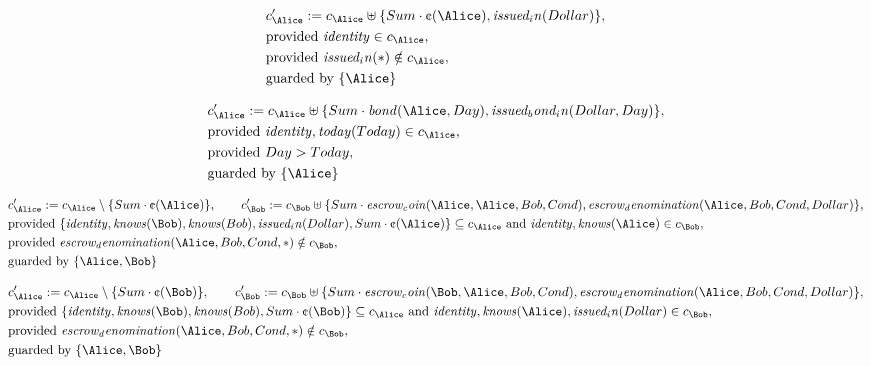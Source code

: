 \begin{align*}
&
c'_
{
\Alice
}
 := 
c_
{
\Alice
}
 \uplus 
\{
Sum
\cdot
\text{\textcent}
(
\Alice
)
,
\mathit{
issued_in
}
(
Dollar
)
\}
,\\
&
\text{provided } 
\mathit{
identity
}
 \in c_
{
\Alice
}
,\\
&
\text{provided } 
\mathit{
issued_in
}
(
\ast
)
 \notin c_
{
\Alice
}
,\\
&
\text{guarded by } \{
\Alice
\}
\end{align*}

\begin{align*}
&
c'_
{
\Alice
}
 := 
c_
{
\Alice
}
 \uplus 
\{
Sum
\cdot
\mathit{
bond
}
(
\Alice
,
Day
)
,
\mathit{
issued_bond_in
}
(
Dollar
,
Day
)
\}
,\\
&
\text{provided } 
\mathit{
identity
}
,
\mathit{
today
}
(
Today
)
 \in c_
{
\Alice
}
,\\
&
\text{provided } 
Day
>
Today
,\\
&
\text{guarded by } \{
\Alice
\}
\end{align*}

\begin{align*}
&
c'_
{
\Alice
}
 := 
c_
{
\Alice
}
 \setminus 
\{
Sum
\cdot
\text{\textcent}
(
\Alice
)
\}
, \qquad 
c'_
{
\Bob
}
 := 
c_
{
\Bob
}
 \uplus 
\{
Sum
\cdot
\mathit{
escrow_coin
}
(
\Alice
,
\Alice
,
Bob
,
Cond
)
,
\mathit{
escrow_denomination
}
(
\Alice
,
Bob
,
Cond
,
Dollar
)
\}
,\\
&
\text{provided } 
\{
\mathit{
identity
}
,
\mathit{
knows
}
(
\Bob
)
,
\mathit{
knows
}
(
Bob
)
,
\mathit{
issued_in
}
(
Dollar
)
,
Sum
\cdot
\text{\textcent}
(
\Alice
)
\}
 \subseteq c_
{
\Alice
}
 \text{ and } 
\mathit{
identity
}
,
\mathit{
knows
}
(
\Alice
)
 \in c_
{
\Bob
}
,\\
&
\text{provided } 
\mathit{
escrow_denomination
}
(
\Alice
,
Bob
,
Cond
,
\ast
)
 \notin c_
{
\Bob
}
,\\
&
\text{guarded by } \{
\Alice
,
\Bob
\}
\end{align*}

\begin{align*}
&
c'_
{
\Alice
}
 := 
c_
{
\Alice
}
 \setminus 
\{
Sum
\cdot
\text{\textcent}
(
\Bob
)
\}
, \qquad 
c'_
{
\Bob
}
 := 
c_
{
\Bob
}
 \uplus 
\{
Sum
\cdot
\mathit{
escrow_coin
}
(
\Bob
,
\Alice
,
Bob
,
Cond
)
,
\mathit{
escrow_denomination
}
(
\Alice
,
Bob
,
Cond
,
Dollar
)
\}
,\\
&
\text{provided } 
\{
\mathit{
identity
}
,
\mathit{
knows
}
(
\Bob
)
,
\mathit{
knows
}
(
Bob
)
,
Sum
\cdot
\text{\textcent}
(
\Bob
)
\}
 \subseteq c_
{
\Alice
}
 \text{ and } 
\mathit{
identity
}
,
\mathit{
knows
}
(
\Alice
)
,
\mathit{
issued_in
}
(
Dollar
)
 \in c_
{
\Bob
}
,\\
&
\text{provided } 
\mathit{
escrow_denomination
}
(
\Alice
,
Bob
,
Cond
,
\ast
)
 \notin c_
{
\Bob
}
,\\
&
\text{guarded by } \{
\Alice
,
\Bob
\}
\end{align*}
